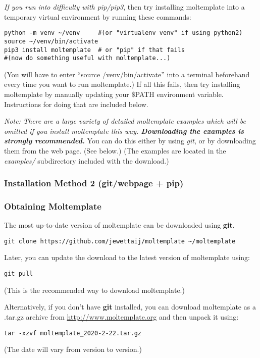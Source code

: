 \documentclass[11pt]{article}
\begin{document}
\textit{If you run into difficulty with pip/pip3}, then try installing
moltemplate into a temporary virtual environment
by running these commands:
\begin{verbatim}
python -m venv ~/venv     #(or "virtualenv venv" if using python2)
source ~/venv/bin/activate
pip3 install moltemplate  # or "pip" if that fails
#(now do something useful with moltemplate...)
\end{verbatim}
(You will have to enter ``source \texttildelow/venv/bin/activate''
 into a terminal beforehand every time you want to run moltemplate.)
If all this fails, then try installing moltemplate by manually
updating your \$PATH environment variable.
Instructions for doing that are included below.

\textit{Note: There are a large variety of detailed moltemplate
examples which will be omitted if you install moltemplate this way.
\textbf{Downloading the examples is strongly recommended.}}
You can do this either by using \textit{git},
or by downloading them from the web page.  (See below.)
(The examples are located in the \textit{examples/} subdirectory
included with the download.)


\subsubsection*{Installation Method 2 (git/webpage + pip)}

\subsubsection*{Obtaining Moltemplate}
The most up-to-date version of moltemplate can be downloaded using \textbf{git}.
\begin{verbatim}
git clone https://github.com/jewettaij/moltemplate ~/moltemplate
\end{verbatim}
Later, you can update the download to the latest version of moltemplate using:
\begin{verbatim}
git pull
\end{verbatim}
(This is the recommended way to download moltemplate.)

Alternatively, if you don't have \textbf{git} installed,
you can download moltemplate as a .tar.gz archive from
\url{http://www.moltemplate.org}
and then unpack it using:
\begin{verbatim}
tar -xzvf moltemplate_2020-2-22.tar.gz
\end{verbatim}
(The date will vary from version to version.)
\end{document}
